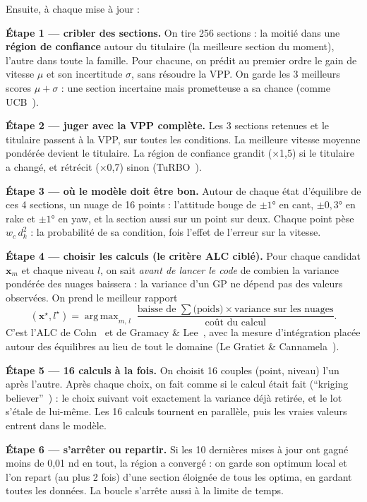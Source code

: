 \documentclass[11pt,a4paper]{article}
\newcommand{\vx}{\bm{x}}
\DeclareMathOperator*{\argmax}{arg\,max}
\begin{document}
Ensuite, à chaque mise à jour :

\textbf{Étape 1 — cribler des sections.} On tire 256 sections : la moitié dans une \textbf{région de
confiance} autour du titulaire (la meilleure section du moment), l'autre dans toute la famille. Pour chacune,
on prédit au premier ordre le gain de vitesse $\mu$ et son incertitude $\sigma$, sans résoudre la VPP. On
garde les 3 meilleurs scores $\mu+\sigma$ : une section incertaine mais prometteuse a sa chance (comme
UCB~\cite{Srinivas10}).

\textbf{Étape 2 — juger avec la VPP complète.} Les 3 sections retenues et le titulaire passent à la VPP, sur
toutes les conditions. La meilleure vitesse moyenne pondérée devient le titulaire. La région de confiance
grandit (×1,5) si le titulaire a changé, et rétrécit (×0,7) sinon (TuRBO~\cite{TuRBO19}).

\textbf{Étape 3 — où le modèle doit être bon.} Autour de chaque état d'équilibre de ces 4 sections, un nuage
de 16 points : l'attitude bouge de $\pm1°$ en cant, $\pm0{,}3°$ en rake et $\pm1°$ en yaw, et la section aussi
sur un point sur deux. Chaque point pèse $w_c\,d_k^2$ : la probabilité de sa condition, fois l'effet de
l'erreur sur la vitesse.

\textbf{Étape 4 — choisir les calculs (le critère ALC ciblé).} Pour chaque candidat $\vx_m$ et chaque niveau
$l$, on sait \emph{avant de lancer le code} de combien la variance pondérée des nuages baissera : la variance
d'un GP ne dépend pas des valeurs observées. On prend le meilleur rapport
\[
(\vx^\star,l^\star)=\argmax_{m,\,l}\;\frac{\text{baisse de }\sum\text{(poids)}\times\text{variance sur les nuages}}{\text{coût du calcul}}.
\]
C'est l'ALC de Cohn~\cite{Cohn96} et de Gramacy \& Lee~\cite{GL09}, avec la mesure d'intégration placée
autour des équilibres au lieu de tout le domaine (Le Gratiet \& Cannamela~\cite{LGC15}).

\textbf{Étape 5 — 16 calculs à la fois.} On choisit 16 couples (point, niveau) l'un après l'autre. Après
chaque choix, on fait comme si le calcul était fait (\enquote{kriging believer}~\cite{GLC10}) : le choix
suivant voit exactement la variance déjà retirée, et le lot s'étale de lui-même. Les 16 calculs tournent en
parallèle, puis les vraies valeurs entrent dans le modèle.

\textbf{Étape 6 — s'arrêter ou repartir.} Si les 10 dernières mises à jour ont gagné moins de 0,01 nd en
tout, la région a convergé : on garde son optimum local et l'on repart (au plus 2 fois) d'une section éloignée
de tous les optima, en gardant toutes les données. La boucle s'arrête aussi à la limite de temps.
\end{document}
